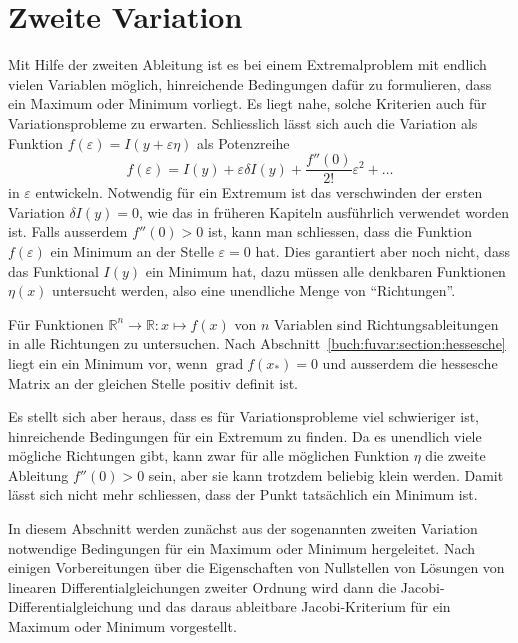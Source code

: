 %
%
%
\chapter{Zweite Variation
\label{buch:chapter:variation2}}
Mit Hilfe der zweiten Ableitung ist es bei einem Extremalproblem
mit endlich vielen Variablen möglich, hinreichende Bedingungen dafür
zu formulieren, dass ein Maximum oder Minimum vorliegt.
Es liegt nahe, solche Kriterien auch für Variationsprobleme
zu erwarten.
Schliesslich lässt sich auch die Variation als Funktion
$f(\varepsilon) = I(y+\varepsilon\eta)$ als Potenzreihe
\[
f(\varepsilon)
=
I(y) + \varepsilon \delta I(y) + \frac{f''(0)}{2!}\varepsilon^2 + \dots
\]
in $\varepsilon$ entwickeln.
Notwendig für ein Extremum ist das verschwinden der ersten Variation
$\delta I(y)=0$, wie das in früheren Kapiteln ausführlich verwendet
worden ist.
Falls ausserdem $f''(0)>0$ ist, kann man schliessen, dass die
Funktion $f(\varepsilon)$ ein Minimum an der Stelle $\varepsilon=0$
hat.
Dies garantiert aber noch nicht, dass das Funktional $I(y)$
ein Minimum hat, dazu müssen alle denkbaren Funktionen $\eta(x)$
untersucht werden, also eine unendliche Menge von ``Richtungen''.

Für Funktionen $\mathbb{R}^n\to\mathbb{R}: x\mapsto f(x)$ von
$n$ Variablen sind Richtungsableitungen in alle Richtungen zu
untersuchen.
Nach Abschnitt~\ref{buch:fuvar:section:hessesche} liegt ein
ein Minimum vor, wenn $\operatorname{grad}f(x_*)=0$ und ausserdem
die hessesche Matrix an der gleichen Stelle positiv definit ist.

Es stellt sich aber heraus, dass es für Variationsprobleme viel
schwieriger ist, hinreichende Bedingungen für ein Extremum zu finden.
Da es unendlich viele mögliche Richtungen gibt, kann zwar für alle
möglichen Funktion $\eta$ die zweite Ableitung $f''(0)>0$ sein, aber 
sie kann trotzdem beliebig klein werden.
Damit lässt sich nicht mehr schliessen, dass der Punkt tatsächlich
ein Minimum ist.

In diesem Abschnitt werden zunächst aus der sogenannten zweiten
Variation notwendige Bedingungen für ein Maximum oder Minimum
hergeleitet.
Nach einigen Vorbereitungen über die Eigenschaften von Nullstellen
von Lösungen von linearen Differentialgleichungen zweiter Ordnung
wird dann die Jacobi-Differentialgleichung und das daraus ableitbare
Jacobi-Kriterium für ein Maximum oder Minimum vorgestellt.






